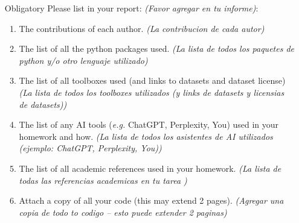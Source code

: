 \documentclass{article}
\begin{document}
\begin{enumerate}
        \item [Obligatory] Please list in your report: \textit{(Favor agregar en tu informe)}:
        \begin{enumerate}
            \item The contributions of each author. \textit{(La contribucion de cada autor)}
            \item The list of all the python packages used. \textit{(La lista de todos los paquetes de python y/o otro lenguaje utilizado)}
            \item The list of all toolboxes used (and links to datasets and dataset license) \textit{(La lista de todos los toolboxes utilizados (y links de datasets y licensias de datasets))}
            \item The list of any AI tools (\textit{e.g.} ChatGPT, Perplexity, You) used in your homework and how. \textit{(La lista de todos los asistentes de AI utilizados (ejemplo: ChatGPT, Perplexity, You))}
            \item The list of all academic references used in your homework. \textit{(La lista de todas las referencias academicas en tu tarea )}
            \item Attach a copy of all your code (this may extend 2 pages). \textit{(Agregar una copia de todo to codigo -- esto puede extender 2 paginas)}
        \end{enumerate}
    \end{enumerate}
\end{document}
